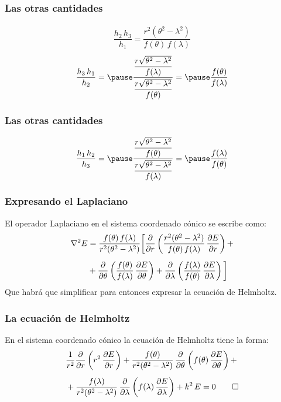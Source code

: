 \documentclass[12pt]{beamer}
\begin{document}
\begin{frame}
\frametitle{Las otras cantidades}
\begin{align*}
\dfrac{h_{2} \, h_{3}}{h_{1}} = \dfrac{r^{2} (\theta^{2} - \lambda^{2})}{f(\theta) \, f(\lambda)}
\end{align*}
\pause
\begin{eqnarray*}
\begin{aligned}
\dfrac{h_{3} \, h_{1}}{h_{2}} = \pause \dfrac{\dfrac{r \sqrt{\theta^{2} - \lambda^{2}}}{f(\lambda)}}{\dfrac{r \sqrt{\theta^{2} - \lambda^{2}}}{f(\theta)}} = \pause \dfrac{f (\theta)}{f (\lambda)}
\end{aligned}
\end{eqnarray*}
\end{frame}
\begin{frame}
\frametitle{Las otras cantidades}
\begin{eqnarray*}
\begin{aligned}
\dfrac{h_{1} \, h_{2}}{h_{3}} = \pause \dfrac{\dfrac{r \sqrt{\theta^{2} - \lambda^{2}}}{f(\theta)}}{\dfrac{r \sqrt{\theta^{2} - \lambda^{2}}}{f(\lambda)}} = \pause \dfrac{f (\lambda)}{f (\theta)}
\end{aligned}
\end{eqnarray*}
\end{frame}
\begin{frame}
\frametitle{Expresando el Laplaciano}
El operador Laplaciano en el sistema coordenado cónico se escribe como:
\pause
\begin{align*}
\laplacian{E} &= \dfrac{f(\theta) \, f(\lambda)}{r^{2} (\theta^{2} - \lambda^{2})} \bigg[ \pdv{r} \left( \dfrac{r^{2} (\theta^{2} - \lambda^{2})}{f(\theta) \, f(\lambda)} \, \pdv{E}{r} \right) + \\[0.5em]
&+ \pdv{\theta} \left( \dfrac{f(\theta)}{f(\lambda)} \, \pdv{E}{\theta} \right) + \pdv{\lambda} \left( \dfrac{f(\lambda)}{f(\theta)} \, \pdv{E}{\lambda} \right) \bigg]
\end{align*}
\pause
Que habrá que simplificar para entonces expresar la ecuación de Helmholtz.
\end{frame}
\begin{frame}
\frametitle{La ecuación de Helmholtz}
En el sistema coordenado cónico la ecuación de Helmholtz tiene la forma:
\begin{align*}
&\dfrac{1}{r^{2}} \pdv{r} \left( r^{2} \, \pdv{E}{r} \right) + \dfrac{f(\theta)}{r^{2} (\theta^{2} - \lambda^{2})} \, \pdv{\theta} \left( f(\theta) \, \pdv{E}{\theta} \right) + \\[0.5em]
&+ \dfrac{f(\lambda)}{r^{2} (\theta^{2} - \lambda^{2})} \, \pdv{\lambda} \left( f(\lambda) \, \pdv{E}{\lambda} \right) + k^{2} \, E = 0 \qed
\end{align*}
\end{frame}
\end{document}

